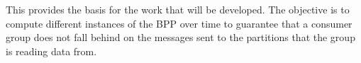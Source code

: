 This provides the basis for the work that will be developed. The objective is to
compute different instances of the BPP over time to guarantee that a consumer
group does not fall behind on the messages sent to the partitions that the group
is reading data from. 



